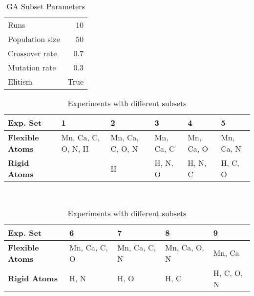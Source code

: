 \begin{table}
	\centering
	\begin{tabular}{ l r }
		\hline
		Runs & 10 \\
		Population size & 50 \\
		Crossover rate & 0.7 \\
		Mutation rate & 0.3 \\
		Elitism & True \\
		\hline
	\end{tabular}
	\caption{GA Subset Parameters}
	\label{table:subset-parameters}
\end{table}

\begin{table}
	\centering
	\begin{tabular}{ | >{\bfseries}p{2cm} | p{1cm} | p{1cm} | p{1cm} | p{1cm} | p{1cm} | }
		\hline
		Exp. Set & 1 & 2 & 3 & 4 & 5 \\ \hline
		Flexible Atoms & Mn, Ca, C, O, N, H & Mn, Ca, C, O, N & Mn, Ca, C & Mn, Ca, O & Mn, Ca, N \\ \hline
		Rigid Atoms &  & H & H, N, O & H, N, C & H, C, O \\ \hline
	\end{tabular}
	\\
	\vspace{3 mm}
	\begin{tabular}{ | >{\bfseries}p{2cm} | p{1cm} | p{1cm} | p{1cm} | p{1cm} | }
		\hline
		Exp. Set & 6 & 7 & 8 & 9 \\ \hline
		Flexible Atoms & Mn, Ca, C, O & Mn, Ca, C, N & Mn, Ca, O, N & Mn, Ca \\ \hline
		Rigid Atoms & H, N & H, O & H, C & H, C, O, N \\ \hline
	\end{tabular}
	\caption{Experiments with different subsets}
	\label{table:subset-setup}
\end{table}